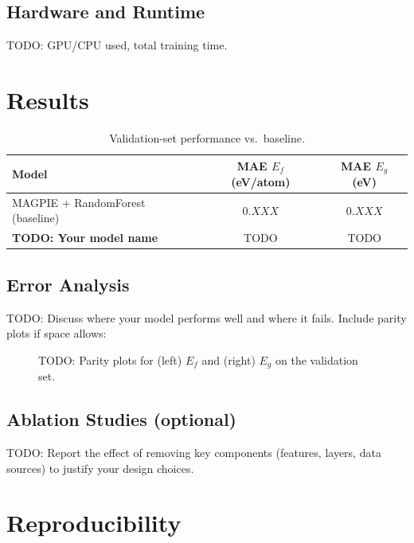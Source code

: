 \documentclass[10pt, a4paper]{article}
\begin{document}
\subsection{Hardware and Runtime}
TODO: GPU/CPU used, total training time.

\section{Results}

\begin{table}[h!]
\centering
\caption{Validation-set performance vs.\ baseline.}
\label{tab:results}
\begin{tabular}{@{}lcc@{}}
\toprule
Model & MAE \(E_f\) (eV/atom) & MAE \(E_g\) (eV) \\
\midrule
MAGPIE + RandomForest (baseline) & \(0.XXX\) & \(0.XXX\) \\
\textbf{TODO: Your model name}   & TODO      & TODO      \\
\bottomrule
\end{tabular}
\end{table}

\subsection{Error Analysis}
TODO: Discuss where your model performs well and where it fails.
Include parity plots if space allows:

\begin{figure}[h!]
  \centering
  \caption{TODO: Parity plots for (left) \(E_f\) and (right) \(E_g\)
    on the validation set.}
  \label{fig:parity}
\end{figure}

\subsection{Ablation Studies (optional)}
TODO: Report the effect of removing key components (features, layers, data
sources) to justify your design choices.

\section{Reproducibility}
\end{document}
